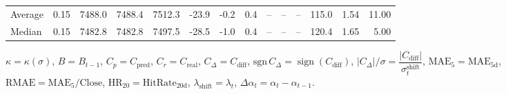 \begin{threeparttable}
{\begin{tabular}{lrrrrrrrrrrrrr}
Average &     0.15 & 7488.0 & 7488.4 & 7512.3 &      -23.9 &                     -0.2 &                 0.4 &         -- &        -- &             -- &            115.0 &            1.54 &                  11.00 \\
 Median &     0.15 & 7482.8 & 7482.8 & 7497.5 &      -28.5 &                     -1.0 &                 0.4 &         -- &        -- &             -- &            120.4 &            1.65 &                   5.00 \\
\bottomrule
\end{tabular}
}
\begin{tablenotes}\footnotesize
\item $\kappa=\kappa(\sigma)$, $B=B_{t-1}$, $C_p=C_{\text{pred}}$, $C_r=C_{\text{real}}$, $C_\Delta=C_{\text{diff}}$, $\mathrm{sgn}\,C_\Delta=\operatorname{sign}(C_{\text{diff}})$, $|C_\Delta|/\sigma=\dfrac{|C_{\text{diff}}|}{\sigma_t^{\text{shift}}}$, $\mathrm{MAE}_5=\mathrm{MAE}_{5\text{d}}$, $\mathrm{RMAE}= \mathrm{MAE}_5 / \text{Close}$, $\mathrm{HR}_{20}=\mathrm{HitRate}_{20\text{d}}$, 
$\lambda_{\text{shift}}=\lambda_t$, 
$\Delta\alpha_t=\alpha_t-\alpha_{t-1}$.
\end{tablenotes}
\end{threeparttable}
\endgroup

